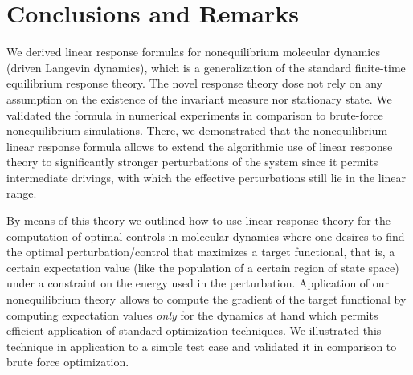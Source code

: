 \documentclass[]{tMPH2e}
\newcommand{\recheck}[1]{{\color{red} #1}}
\begin{document}
 





\section{Conclusions and Remarks}


\recheck{
We derived linear response formulas for nonequilibrium molecular
dynamics (driven Langevin dynamics), which is a generalization of the
standard finite-time equilibrium response theory.  The novel response theory
dose not rely on any assumption on the existence of the invariant
measure nor stationary state. We validated the formula in numerical
experiments in comparison to brute-force nonequilibrium
simulations. There, we demonstrated that the nonequilibrium linear
response formula allows to extend the algorithmic use of linear
response theory to significantly stronger perturbations of the system
since it permits intermediate drivings, with which the effective perturbations
still lie in the linear range.
}

By means of this theory we outlined how to use linear response theory for the computation of optimal controls in molecular dynamics where one desires to find the optimal perturbation/control that maximizes a target functional, that is, a certain expectation value (like the population of a certain region of state space) under a constraint on the energy used in the perturbation. Application of our nonequilibrium theory allows to compute the gradient of the target functional by computing expectation values \emph{only} for the dynamics at hand which permits efficient application of standard optimization techniques. We illustrated this technique in application to a simple test case and validated it in comparison to brute force optimization.  













\end{document}
